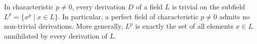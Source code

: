 In characteristic $p \neq 0$, every derivation $D$ of a field $L$ is trivial on the subfield $L^p = \{x^p \mid x \in L\}$. In particular, a perfect field of characteristic $p \neq 0$ admits no non-trivial derivations. More generally, $L^p$ is exactly the set of all elements $x \in L$ annihilated by every derivation of $L$.
